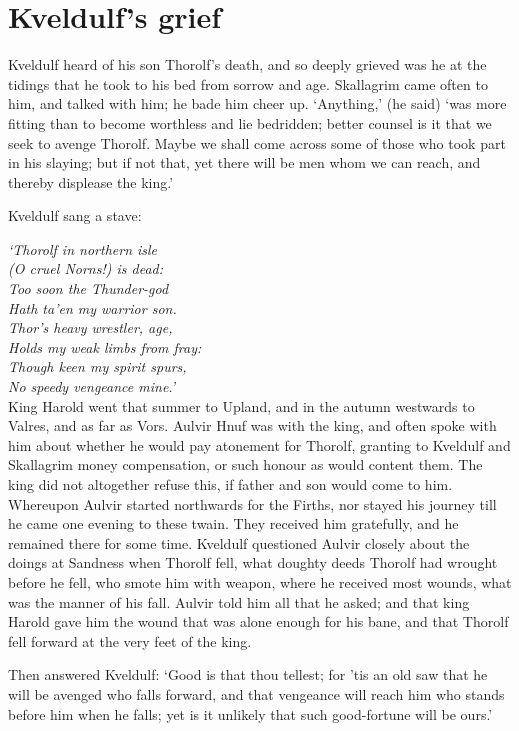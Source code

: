 \chapter{Kveldulf's grief}
Kveldulf heard of his son Thorolf's death, and so deeply grieved was he at the tidings that he took to his bed from sorrow and age. Skallagrim came often to him, and talked with him; he bade him cheer up. `Anything,' (he said) `was more fitting than to become worthless and lie bedridden; better counsel is it that we seek to avenge Thorolf. Maybe we shall come across some of those who took part in his slaying; but if not that, yet there will be men whom we can reach, and thereby displease the king.'

Kveldulf sang a stave:

{\centering\emph{
	`Thorolf in northern isle \\
	(O cruel Norns!) is dead: \\
	Too soon the Thunder-god \\
	Hath ta'en my warrior son. \\
	Thor's heavy wrestler, age, \\
	Holds my weak limbs from fray: \\
	Though keen my spirit spurs, \\
	No speedy vengeance mine.' \\
}}
King Harold went that summer to Upland, and in the autumn westwards to Valres, and as far as Vors. Aulvir Hnuf was with the king, and often spoke with him about whether he would pay atonement for Thorolf, granting to Kveldulf and Skallagrim money compensation, or such honour as would content them. The king did not altogether refuse this, if father and son would come to him. Whereupon Aulvir started northwards for the Firths, nor stayed his journey till he came one evening to these twain. They received him gratefully, and he remained there for some time. Kveldulf questioned Aulvir closely about the doings at Sandness when Thorolf fell, what doughty deeds Thorolf had wrought before he fell, who smote him with weapon, where he received most wounds, what was the manner of his fall. Aulvir told him all that he asked; and that king Harold gave him the wound that was alone enough for his bane, and that Thorolf fell forward at the very feet of the king.

Then answered Kveldulf: `Good is that thou tellest; for 'tis an old saw that he will be avenged who falls forward, and that vengeance will reach him who stands before him when he falls; yet is it unlikely that such good-fortune will be ours.'

